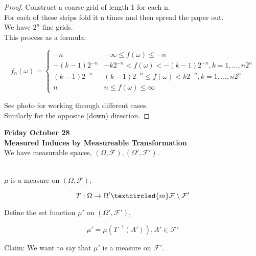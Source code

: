 \documentclass[11pt,fleqn]{book} %
\begin{document}
\begin{proof}
	Construct a coarse grid of length 1 for each n. \\

	For each of these strips fold it n times and then spread the paper out. \\

	We have $2^n$ fine grids. \\

	This process as a formula: 

			$$f_n (\omega) = \left\{ \begin{array}{ll}
				-n & -\infty \leq f (\omega) \leq -n\\
				-(k-1) 2^{-n} & -k 2^{-n} < f(\omega) < -(k-1) 2^{-n}, k = 1, \dots, n2^n\\
				(k-1) 2^{-n} & (k-1) 2^{-n} \leq f(\omega) < k 2^{-n}, k = 1, \dots, n2^n\\
				n & n \leq f(\omega) \leq \infty 
			\end{array} \right.$$

See photo for working through different cases. \\

Similarly for the opposite (down) direction. 

\end{proof}

\textbf{Friday October 28}\\

\textbf{Measured Induces by Measureable Transformation}\\

We have measurable spaces, $(\Omega, \mathcal{F}), (\Omega', \mathcal{F}')$. \\\

$\mu$ is a measure on $(\Omega, \mathcal{F})$, 

		$$T:  \Omega \rightarrow \Omega' \textcircled{m} \mathcal{F}\setminus \mathcal{F}' $$


Define the set function $\mu'$ on $(\Omega', \mathcal{F}')$, 

		$$\mu' = \mu (T^{-1}(A')), A' \in \mathcal{F}' $$

Claim: We want to say that $\mu'$ is a measure on $\mathcal{F}'$. 
\end{document}
